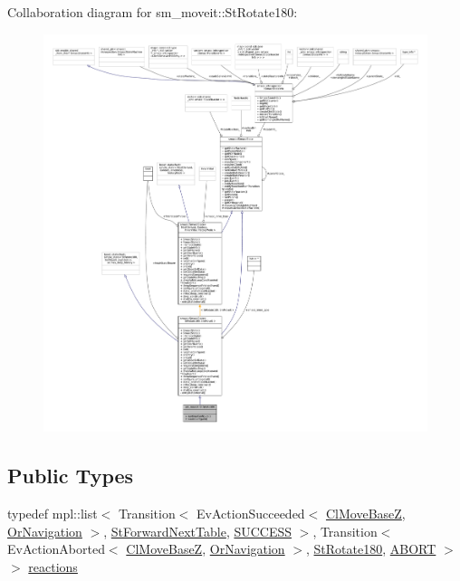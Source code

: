 Collaboration diagram for sm\+\_\+moveit\+:\+:St\+Rotate180\+:
\nopagebreak
\begin{figure}[H]
\begin{center}
\leavevmode
\includegraphics[width=350pt]{structsm__moveit_1_1StRotate180__coll__graph}
\end{center}
\end{figure}
\subsection*{Public Types}
\begin{DoxyCompactItemize}
\item 
typedef mpl\+::list$<$ Transition$<$ Ev\+Action\+Succeeded$<$ \hyperlink{classcl__move__base__z_1_1ClMoveBaseZ}{Cl\+Move\+BaseZ}, \hyperlink{classsm__moveit_1_1OrNavigation}{Or\+Navigation} $>$, \hyperlink{structsm__moveit_1_1StForwardNextTable}{St\+Forward\+Next\+Table}, \hyperlink{classSUCCESS}{S\+U\+C\+C\+E\+SS} $>$, Transition$<$ Ev\+Action\+Aborted$<$ \hyperlink{classcl__move__base__z_1_1ClMoveBaseZ}{Cl\+Move\+BaseZ}, \hyperlink{classsm__moveit_1_1OrNavigation}{Or\+Navigation} $>$, \hyperlink{structsm__moveit_1_1StRotate180}{St\+Rotate180}, \hyperlink{classABORT}{A\+B\+O\+RT} $>$ $>$ \hyperlink{structsm__moveit_1_1StRotate180_a1f3d4ae503a581dfffd91742b9c77610}{reactions}
\end{DoxyCompactItemize}
